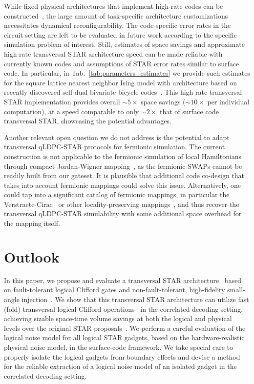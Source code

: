 \documentclass[aps, prx, reprint, superscriptaddress, longbibliography, floatfix]{revtex4-2}
\begin{document}
While fixed physical architectures that implement high-rate codes can be constructed~\cite{Bravyi2024}, the large amount of task-specific architecture customizations necessitates dynamical reconfigurability. The code-specific error rates in the circuit setting are left to be evaluated in future work according to the specific simulation problem of interest. Still, estimates of space savings and approximate high-rate transversal STAR architecture speed can be made reliable with currently known codes and assumptions of STAR error rates similar to surface code. In particular, in Tab.~\ref{tab:parameters_estimates} we provide such estimates for the square lattice nearest neighbor Ising model with architecture based on recently discovered self-dual bivariate bicycle codes~\cite{Xu2025batched}. This high-rate transversal STAR implementation provides overall $\sim 5\times$ space savings ($\sim 10 \times$ per individual computation), at a speed comparable to only $\sim 2\times$ that of surface code transversal STAR, showcasing the potential advantages.

Another relevant open question we do not address is the potential to adapt transversal qLDPC-STAR protocols for fermionic simulation. The current construction is not applicable to the fermionic simulation of local Hamiltonians through compact Jordan-Wigner mapping~\cite{Jordan1928}, as the fermionic SWAPs cannot be readily built from our gateset. It is plausible that additional code co-design that takes into account fermionic mappings could solve this issue. Alternatively, one could tap into a significant catalog of fermionic mappings, in particular the Verstraete-Cirac~\cite{Verstraete2005, Evered2025} or other locality-preserving mappings~\cite{Bravyi2002, Derby2021}, and thus recover the transversal qLDPC-STAR simulability with some additional space overhead for the mapping itself.

\section{Outlook}
\label{sec:outlook}

In this paper, we propose and evaluate a transversal STAR architecture~\cite{Akahoshi2024, Toshio2024} based on fault-tolerant logical Clifford gates and non-fault-tolerant, high-fidelity small-angle injection~\cite{Choi2023}. We show that this transversal STAR architecture can utilize fast (fold) transversal logical Clifford operations~\cite{Cain2025, Zhou2024} in the correlated decoding setting, achieving sizable space-time volume savings at both the logical and physical levels over the original STAR proposals~\cite{Akahoshi2024, Toshio2024}. We perform a careful evaluation of the logical noise model for all logical STAR gadgets, based on the hardware-realistic physical noise model, in the surface-code framework. We take special care to properly isolate the logical gadgets from boundary effects and devise a method for the reliable extraction of a logical noise model of an isolated gadget in the correlated decoding setting. 
\end{document}

